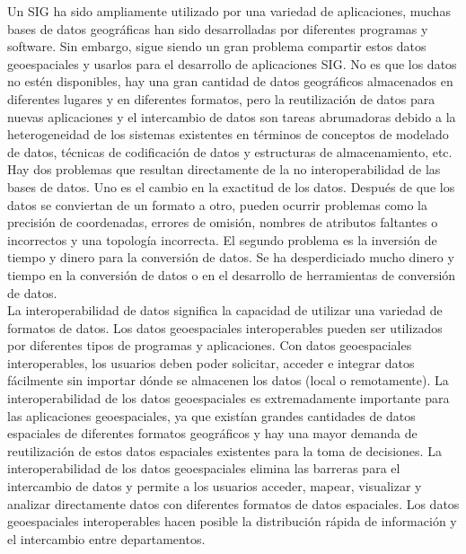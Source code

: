 




Un SIG ha sido ampliamente utilizado por una variedad de aplicaciones, muchas bases de datos geográficas han sido desarrolladas por diferentes programas y software. Sin embargo, sigue siendo un gran problema compartir estos datos geoespaciales y usarlos para el desarrollo de aplicaciones SIG. No es que los datos no estén disponibles, hay una gran cantidad de datos geográficos almacenados en diferentes lugares y en diferentes formatos, pero la reutilización de datos para nuevas aplicaciones y el intercambio de datos son tareas abrumadoras debido a la heterogeneidad de los sistemas existentes en términos de conceptos de modelado de datos, técnicas de codificación de datos y estructuras de almacenamiento, etc.\\

Hay dos problemas que resultan directamente de la no interoperabilidad de las bases de datos. Uno es el cambio en la exactitud de los datos. Después de que los datos se conviertan de un formato a otro, pueden ocurrir problemas como la precisión de coordenadas, errores de omisión, nombres de atributos faltantes o incorrectos y una topología incorrecta. El segundo problema es la inversión de tiempo y dinero para la conversión de datos. Se ha desperdiciado mucho dinero y tiempo en la conversión de datos o en el desarrollo de herramientas de conversión de datos.\\

La interoperabilidad de datos significa la capacidad de utilizar una variedad de formatos de datos. Los datos geoespaciales interoperables pueden ser utilizados por diferentes tipos de programas y aplicaciones. Con datos geoespaciales interoperables, los usuarios deben poder solicitar, acceder e integrar datos fácilmente sin importar dónde se almacenen los datos (local o remotamente). La interoperabilidad de los datos geoespaciales es extremadamente importante para las aplicaciones geoespaciales, ya que existían grandes cantidades de datos espaciales de diferentes formatos geográficos y hay una mayor demanda de reutilización de estos datos espaciales existentes para la toma de decisiones. La interoperabilidad de los datos geoespaciales elimina las barreras para el intercambio de datos y permite a los usuarios acceder, mapear, visualizar y analizar directamente datos con diferentes formatos de datos espaciales. Los datos geoespaciales interoperables hacen posible la distribución rápida de información y el intercambio entre departamentos.\\


